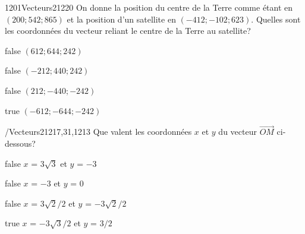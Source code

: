             \begin{question}{1201}{Vecteurs}{2}{1220}
                On donne la position du centre de la Terre comme étant en $(200;542;865)$ et la position d'un satellite en $(-412;-102;623)$. Quelles sont les coordonnées du vecteur reliant le centre de la Terre au satellite?
            \end{question}
            \begin{reponses}
                \item[false] $(612;644;242)$
                \item[false] $(-212;440;242)$
                \item[false] $(212;-440;-242)$
                \item[true] $(-612;-644;-242)$
            \end{reponses}
            \begin{question}{/}{Vecteurs}{2}{1217,31,1213}
                Que valent les coordonnées $x$ et $y$ du vecteur $\vec{OM}$ ci-dessous? \\ 
            \end{question}
            \begin{reponses}
                \item[false] $x$ = $3\sqrt{3}$ et $y$ = $-3$
                \item[false] $x$ = $-3$ et $y$ = $0$
                \item[false] $x$ = $3\sqrt{2}/2$ et $y$ = $-3\sqrt{2}/2$
                \item[true] $x$ = $-3\sqrt{3}/2$ et $y$ = $3/2$
            \end{reponses}
